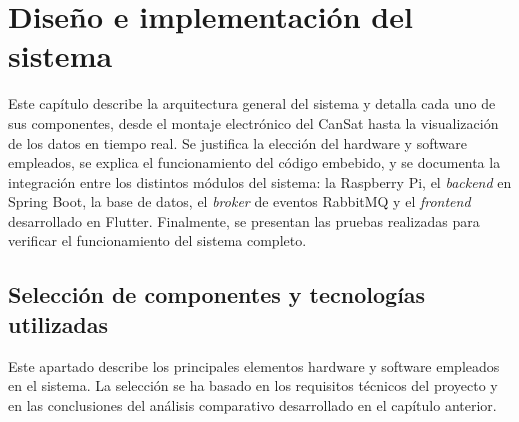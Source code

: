 \chapter{Diseño e implementación del sistema}
Este capítulo describe la arquitectura general del sistema y detalla cada uno de sus componentes, desde el montaje electrónico del CanSat hasta la visualización de los datos en tiempo real.
Se justifica la elección del hardware y software empleados, se explica el funcionamiento del código embebido, y se documenta la integración entre los distintos módulos del sistema: la Raspberry Pi, el \emph{backend} en Spring Boot, la base de datos, el \emph{broker} de eventos RabbitMQ y el \emph{frontend} desarrollado en Flutter.
Finalmente, se presentan las pruebas realizadas para verificar el funcionamiento del sistema completo.


\section{Selección de componentes y tecnologías utilizadas}


Este apartado describe los principales elementos hardware y software empleados en el sistema.
%
La selección se ha basado en los requisitos técnicos del proyecto y en las conclusiones del análisis comparativo desarrollado en el capítulo anterior.

